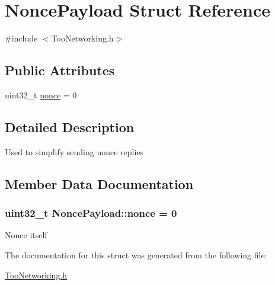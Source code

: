 \hypertarget{structNoncePayload}{}\section{Nonce\+Payload Struct Reference}
\label{structNoncePayload}


{\ttfamily \#include $<$Too\+Networking.\+h$>$}

\subsection*{Public Attributes}
\begin{DoxyCompactItemize}
\item 
uint32\+\_\+t \hyperlink{structNoncePayload_ac738ccf9734f52407eef0b48bdf6cb01}{nonce} = 0
\end{DoxyCompactItemize}


\subsection{Detailed Description}
Used to simplify sending nonce replies 

\subsection{Member Data Documentation}
\subsubsection[{\texorpdfstring{nonce}{nonce}}]{\setlength{\rightskip}{0pt plus 5cm}uint32\+\_\+t Nonce\+Payload\+::nonce = 0}\hypertarget{structNoncePayload_ac738ccf9734f52407eef0b48bdf6cb01}{}\label{structNoncePayload_ac738ccf9734f52407eef0b48bdf6cb01}
Nonce itself 

The documentation for this struct was generated from the following file\+:\begin{DoxyCompactItemize}
\item 
\hyperlink{TooNetworking_8h}{Too\+Networking.\+h}\end{DoxyCompactItemize}
